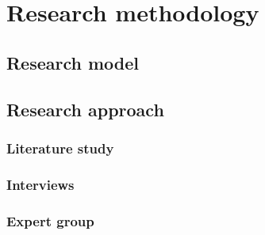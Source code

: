 
\chapter{Research methodology} \label{research_methodology}

\section{Research model} \label{research_model}

\section{Research approach} \label{research_approach}

\subsection{Literature study} \label{literature_study}

\subsection{Interviews} \label{interviews}

\subsection{Expert group} \label{expert_group}